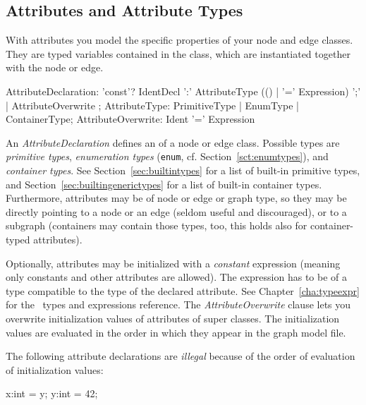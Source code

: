 \pagebreak

\subsection{Attributes and Attribute Types}
\label{sct:attrtypes}

With attributes you model the specific properties of your node and edge classes.
They are typed variables contained in the class, which are instantiated together with the node or edge.

\begin{rail}
  AttributeDeclaration: 'const'? IdentDecl ':' AttributeType (() | '=' Expression) ';' | AttributeOverwrite ;
  AttributeType: PrimitiveType | EnumType | ContainerType;
  AttributeOverwrite: Ident '=' Expression
\end{rail}

An \emph{AttributeDeclaration} defines an  of a node or edge class.
Possible types are \emph{primitive types}, \emph{enumeration types} (\texttt{enum}, cf. Section~\ref{sct:enumtypes}), and \emph{container types}.
See Section~\ref{sec:builtintypes} for a list of built-in primitive types, and Section~\ref{sec:builtingenerictypes} for a list of built-in container types.
Furthermore, attributes may be of node or edge or graph type, so they may be directly pointing to a node or an edge (seldom useful and discouraged), or to a subgraph (containers may contain those types, too, this holds also for container-typed attributes).

Optionally, attributes may be initialized with a \emph{constant} expression (meaning only constants and other attributes are allowed).
The expression has to be of a type compatible to the type of the declared attribute.
See Chapter~\ref{cha:typeexpr} for the \GrG\ types and expressions reference.
The \emph{AttributeOverwrite} clause lets you overwrite initialization values of attributes of super classes.
The initialization values are evaluated in the order in which they appear in the graph model file.

\begin{warning}
	The following attribute declarations are \emph{illegal} because of the order of evaluation of initialization values:
	\begin{grgen}
x:int = y;
y:int = 42;
	\end{grgen}
\end{warning}

